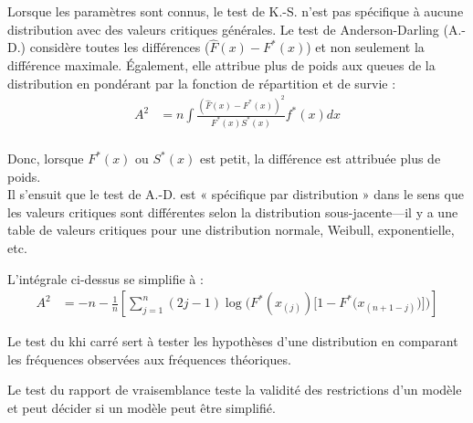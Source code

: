 \documentclass[10pt, french]{article}
\begin{document}
\begin{multicols*}{2}
\begin{center}
\begin{tikzpicture}[x=0.75pt,y=0.75pt,yscale=-1,xscale=1]
\end{tikzpicture}
\end{center}

Lorsque les paramètres sont connus, le test de K.-S. n'est pas spécifique à aucune distribution avec des valeurs critiques générales. Le test de Anderson-Darling (A.-D.) considère toutes les différences ($\hat{F}(x)	-	F^{\ast}(x)$) et non seulement la différence maximale. Également, elle attribue plus de poids aux queues de la distribution en pondérant par la fonction de répartition et de survie :
\begin{align*}
	A^{2}
	&=	n \int  \frac{(\hat{F}(x)	-	F^{\ast}(x))^{2}}{F^{\ast}(x) S^{\ast}(x)}f^{\ast}(x) dx	\\
\end{align*}

Donc, lorsque $F^{\ast}(x)$ ou $S^{\ast}(x)$ est petit, la différence est attribuée plus de poids.\\

Il s'ensuit que le test de A.-D. est « spécifique par distribution » dans le sens que les valeurs critiques sont différentes selon la distribution sous-jacente---il y a une table de valeurs critiques pour une distribution normale, Weibull, exponentielle, etc.

\begin{definitionNOHFILLsub}
L'intégrale ci-dessus se simplifie à :
\begin{align*}
	A^{2}
	&=	-n	-\frac{1}{n} \left[
		\sum_{j = 1}^{n} (2j - 1)\log\bigg(F^{\ast}(x_{(j)})\Big[1	-	F^{\ast}\big(x_{(n + 1 - j)}\big)\Big]\bigg)
	\right]
\end{align*}
\end{definitionNOHFILLsub}

Le test du khi carré sert à tester les hypothèses d'une distribution en comparant les fréquences observées aux fréquences théoriques.

\begin{definitionNOHFILLsub}

\end{definitionNOHFILLsub}

Le test du rapport de vraisemblance teste la validité des restrictions d'un modèle et peut décider si un modèle peut être simplifié.
\begin{definitionNOHFILLsub}

\end{definitionNOHFILLsub}


\end{multicols*}
\end{document}
